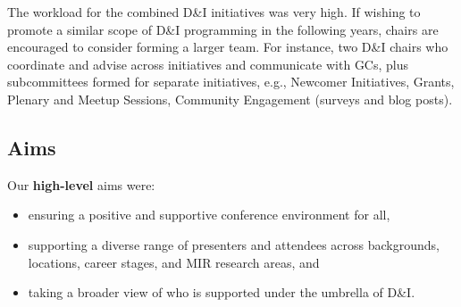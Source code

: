 \documentclass[%
10pt,								%
titlepage,						%
]
{scrartcl}
\begin{document}
    The workload for the combined D\&I initiatives was very high. If wishing to promote a similar scope of D\&I programming in the following years, chairs are encouraged to consider forming a larger team. For instance, two D\&I chairs who coordinate and advise across initiatives and communicate with GCs, plus subcommittees formed for separate initiatives, e.g., Newcomer Initiatives, Grants, Plenary and Meetup Sessions, Community Engagement (surveys and blog posts).

    \subsection{Aims}
        Our \textbf{high-level} aims were:
        \begin{itemize}
            \item   ensuring a positive and supportive conference environment for all,
            \item   supporting a diverse range of presenters and attendees across backgrounds, locations, career stages, and MIR research areas, and
            \item   taking a broader view of who is supported under the umbrella of D\&I.
        \end{itemize}
\end{document}
